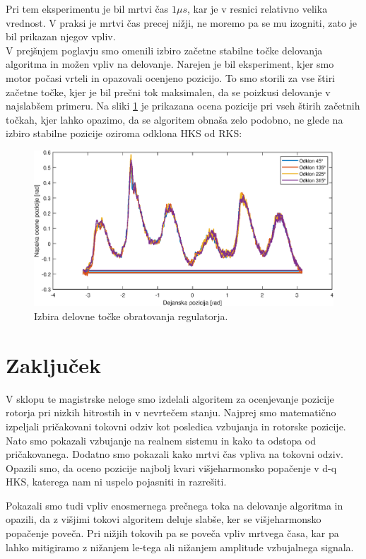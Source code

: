 \documentclass[a4paper,twoside,openright,12pt,slovene]{book}
\begin{document}
Pri tem eksperimentu je bil mrtvi čas $1 \mu s$, kar je v resnici relativno velika vrednost. V praksi je mrtvi čas precej nižji, ne moremo pa se mu izogniti, zato je bil prikazan njegov vpliv.
\\
V prejšnjem poglavju smo omenili izbiro začetne stabilne točke delovanja algoritma in možen vpliv na delovanje. Narejen je bil eksperiment, kjer smo motor počasi vrteli in opazovali ocenjeno pozicijo.
To smo storili za vse štiri začetne točke, kjer je bil prečni tok maksimalen, da se poizkusi delovanje v najslabšem primeru. Na sliki \ref{izbiraStabilneTocke} je prikazana ocena pozicije pri vseh
štirih začetnih točkah, kjer lahko opazimo, da se algoritem obnaša zelo podobno, ne glede na izbiro stabilne pozicije oziroma odklona HKS od RKS:

\begin{figure}[!htbp]
    \centering
    \includegraphics[width=0.75\columnwidth]{Slike/izbiraStabilneTocke.eps}
    \caption{\label{izbiraStabilneTocke} Izbira delovne točke obratovanja regulatorja. }
\end{figure}

\chapter{Zaključek} \label{zakljucek}

V sklopu te magistrske neloge smo izdelali algoritem za ocenjevanje pozicije rotorja pri nizkih hitrostih in v nevrtečem stanju. Najprej smo matematično izpeljali pričakovani tokovni odziv kot
posledica vzbujanja in rotorske pozicije. Nato smo pokazali vzbujanje na realnem sistemu in kako ta odstopa od pričakovanega. Dodatno smo pokazali kako mrtvi čas vpliva na tokovni odziv. Opazili smo,
da oceno pozicije najbolj kvari višjeharmonsko popačenje v d-q HKS, katerega nam ni uspelo pojasniti in razrešiti. 

Pokazali smo tudi vpliv enosmernega prečnega toka na delovanje algoritma in opazili, da z višjimi tokovi algoritem deluje slabše, ker se višjeharmonsko popačenje poveča. Pri nižjih tokovih pa se
poveča vpliv mrtvega časa, kar pa lahko mitigiramo z nižanjem le-tega ali nižanjem amplitude vzbujalnega signala.
\end{document}
